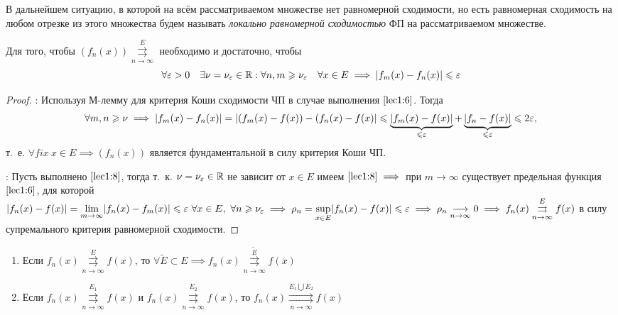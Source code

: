 \documentclass[../../main.tex]{subfiles}
\begin{document}
В дальнейшем ситуацию, в которой на всём рассматриваемом 
множестве нет равномерной сходимости, но есть равномерная 
сходимость на любом отрезке из этого множества будем называть 
\emph{локально равномерной сходимостью} ФП на рассматриваемом множестве.

\begin{thm}
Для того, чтобы $(f_n(x)) \overset{E}
{\underset{n \to \infty}\rightrightarrows}$ необходимо и достаточно, 
чтобы 
\begin{equation}
\label{lec1:8}
\forall \varepsilon > 0 \quad \exists \nu=\nu_\varepsilon \in \mathbb{R} :
\forall n,m \geqslant \nu_\varepsilon \quad \forall x \in E \implies 
|f_m(x) - f_n(x)| \leqslant \varepsilon
\end{equation}
\end{thm}	

\begin{proof}
\;

\nec: Используя М-лемму для критерия Коши сходимости ЧП 
в случае выполнения $\eqref{lec1:6}$. Тогда
\[\forall m, n \geqslant \nu \implies |f_m(x) - f_n(x)| = 
|(f_m(x) - f(x)) - (f_n(x) - f(x)| \leqslant 
\underbrace{|f_m(x) - f(x)|}_{\leqslant \varepsilon} + 
\underbrace{|f_n - f(x)|}_{\leqslant \varepsilon} \leqslant  2\varepsilon,\] т.~е. 
$\forall fix \ x \in E \implies (f_n(x))$ 
является фундаментальной в силу критерия Коши ЧП.

\suff: Пусть выполнено $\eqref{lec1:8}$, тогда т.~к. $\nu=\nu_\varepsilon \in \mathbb{R}$
не зависит от $x \in E$ имеем $\eqref{lec1:8} \implies$ при $m \to \infty$ 
существует предельная функция 
$\eqref{lec1:6}$, для которой $|f_n(x) - f(x)| = 
\underset{m \to \infty}{\lim} |f_n(x) - f_m(x)| \leq  \eps \ 
\forall x \in E,\ \forall n \geq \nu_\eps \implies \rho_n = 
\underset{x \in E}{\sup} |f_n(x) - f(x)| \leq \eps \implies 
\rho_n \underset{n \to \infty}{\longrightarrow} 0 \implies
f_n(x) \overset{E}
{\underset{n \to \infty}\rightrightarrows} f(x)$
в силу супремального критерия равномерной сходимости. 
\end{proof}	

\begin{rem}
	\;
	
	\begin{enumerate}
		\item Если $f_n(x) \overset{E}
{\underset{n \to \infty}\rightrightarrows} f(x)$, то 
$\forall \widetilde{E} \subset E \implies f_n(x) \overset{\widetilde{E}}
{\underset{n \to \infty}\rightrightarrows} f(x)$
		\item Если $f_n(x) \overset{E_1}
		{\underset{n \to \infty}\rightrightarrows} f(x)$ и 
		$f_n(x) \overset{E_2}
		{\underset{n \to \infty}\rightrightarrows} f(x)$, то
		$f_n(x) \overset{E_1 \bigcup E_2}
		{\underset{n \to \infty}\rightrightarrows} f(x)$
	\end{enumerate}
\end{rem}	
\end{document}
